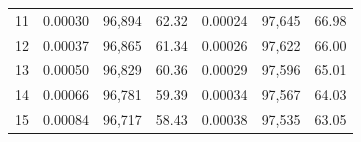 \begin{tabular}{cccc|ccc}
11   & 0.00030                                                          & 96,894                                                                                            & 62.32                                                                                                                      & 0.00024                                                          & 97,645                                                                                            & 66.98                                                                                                                      \\
12   & 0.00037                                                          & 96,865                                                                                            & 61.34                                                                                                                      & 0.00026                                                          & 97,622                                                                                            & 66.00                                                                                                                      \\
13   & 0.00050                                                          & 96,829                                                                                            & 60.36                                                                                                                      & 0.00029                                                          & 97,596                                                                                            & 65.01                                                                                                                      \\
14   & 0.00066                                                          & 96,781                                                                                            & 59.39                                                                                                                      & 0.00034                                                          & 97,567                                                                                            & 64.03                                                                                                                      \\
15   & 0.00084                                                          & 96,717                                                                                            & 58.43                                                                                                                      & 0.00038                                                          & 97,535                                                                                            & 63.05                                                                                                                      \\

\end{tabular}

